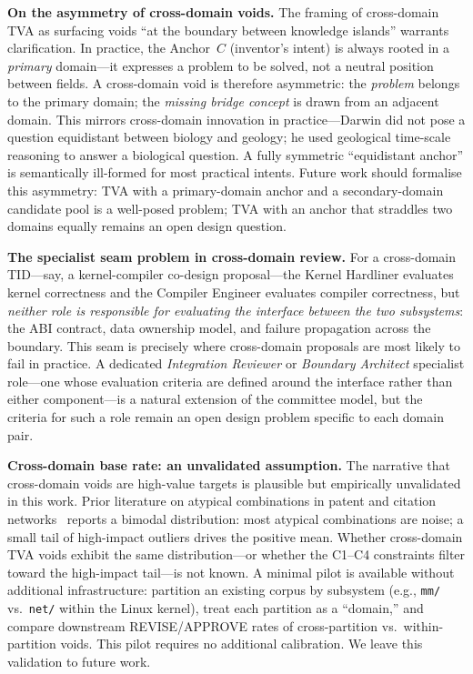 \documentclass[11pt,twocolumn]{article}
\begin{document}
\textbf{On the asymmetry of cross-domain voids.}
The framing of cross-domain TVA as surfacing voids ``at the boundary
between knowledge islands'' warrants clarification.  In practice,
the Anchor~$C$ (inventor's intent) is always rooted in a \emph{primary}
domain---it expresses a problem to be solved, not a neutral position
between fields.  A cross-domain void is therefore asymmetric: the
\emph{problem} belongs to the primary domain; the \emph{missing bridge
concept} is drawn from an adjacent domain.  This mirrors cross-domain
innovation in practice---Darwin did not pose a question equidistant
between biology and geology; he used geological time-scale reasoning
to answer a biological question.  A fully symmetric ``equidistant anchor''
is semantically ill-formed for most practical intents.  Future work
should formalise this asymmetry: TVA with a primary-domain anchor and
a secondary-domain candidate pool is a well-posed problem; TVA with an
anchor that straddles two domains equally remains an open design question.

\textbf{The specialist seam problem in cross-domain review.}
For a cross-domain TID---say, a kernel-compiler co-design proposal---the
Kernel Hardliner evaluates kernel correctness and the Compiler Engineer
evaluates compiler correctness, but \emph{neither role is responsible for
evaluating the interface between the two subsystems}: the ABI contract,
data ownership model, and failure propagation across the boundary.
This seam is precisely where cross-domain proposals are most likely to
fail in practice.  A dedicated \emph{Integration Reviewer} or
\emph{Boundary Architect} specialist role---one whose evaluation criteria
are defined around the interface rather than either component---is a
natural extension of the committee model, but the criteria for such a
role remain an open design problem specific to each domain pair.

\textbf{Cross-domain base rate: an unvalidated assumption.}
The narrative that cross-domain voids are high-value targets is plausible
but empirically unvalidated in this work.  Prior literature on atypical
combinations in patent and citation networks~\cite{uzzi2013atypical}
reports a bimodal distribution: most atypical combinations are noise;
a small tail of high-impact outliers drives the positive mean.
Whether cross-domain TVA voids exhibit the same distribution---or whether
the C1--C4 constraints filter toward the high-impact tail---is not known.
A minimal pilot is available without additional infrastructure: partition
an existing corpus by subsystem (e.g., \texttt{mm/} vs.\ \texttt{net/}
within the Linux kernel), treat each partition as a ``domain,'' and
compare downstream REVISE/APPROVE rates of cross-partition vs.\
within-partition voids.  This pilot requires no additional calibration.
We leave this validation to future work.
\end{document}

